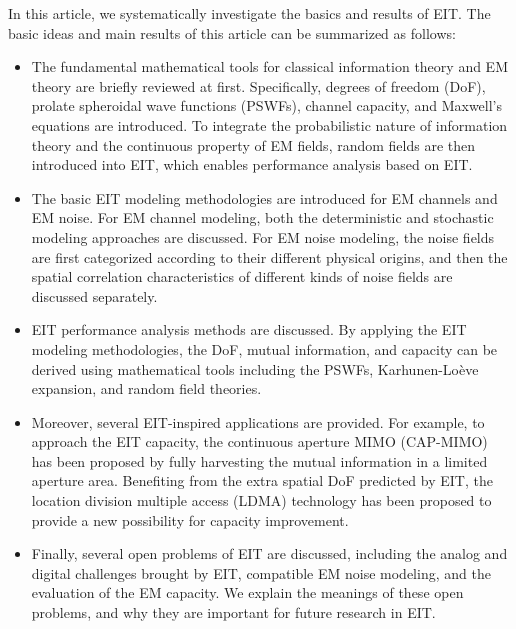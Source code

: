 \documentclass[journal,twocolumn]{IEEEtran}
\begin{document}
In this article, we systematically investigate the basics and results of EIT. The basic ideas and main results of this article can be summarized as follows:
\begin{itemize}
\item{The fundamental mathematical tools for classical information theory and EM theory are briefly reviewed at first. Specifically, degrees of freedom (DoF), prolate spheroidal wave functions (PSWFs), channel capacity, and Maxwell's equations are introduced. To integrate the probabilistic nature of information theory and the continuous property of EM fields, random fields are then introduced into EIT, which enables performance analysis based on EIT. }
\item{The basic EIT modeling methodologies are introduced for EM channels and EM noise. For EM channel modeling, both the deterministic and stochastic modeling approaches are discussed. For EM noise modeling, the noise fields are first categorized according to their different physical origins, and then the spatial correlation characteristics of different kinds of noise fields are discussed separately. }
\item{EIT performance analysis methods are discussed. By applying the EIT modeling methodologies, the DoF, mutual information, and capacity can be derived using mathematical tools including the PSWFs, Karhunen-Lo\`{e}ve expansion, and random field theories. } 
\item Moreover, several EIT-inspired applications are provided. For example, to approach the EIT capacity, the continuous aperture MIMO (CAP-MIMO) has been proposed by fully harvesting the mutual information in a limited aperture area. Benefiting from the extra spatial DoF predicted by EIT, the location division multiple access (LDMA) technology has been proposed to provide a new possibility for capacity improvement. %
\item{Finally, several open problems of EIT are discussed, including the analog and digital challenges brought by EIT, compatible EM noise modeling, and the evaluation of the EM capacity. We explain the meanings of these open problems, and why they are important for future research in EIT. }
\end{itemize}
\end{document}
